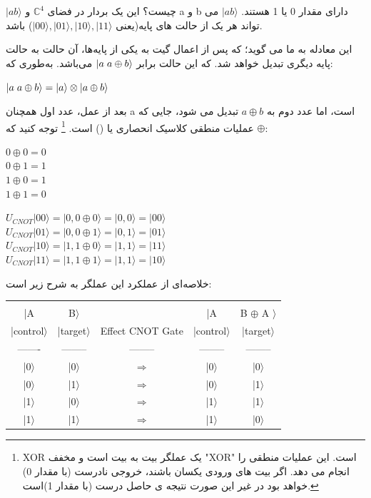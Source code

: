 \documentclass{book}
\begin{document}
 $\vert ab \rangle$ چیست؟
  این یک بردار در فضای $\mathbb{C}^4$ و a و b دارای مقدار 0 یا 1 هستند.  $\vert ab \rangle$ می تواند هر یک از حالت های پایه(یعنی  $\vert 00 \rangle, \vert 01 \rangle, \vert 10 \rangle, \vert 11 \rangle$) باشد.
 
  
  
   این معادله به ما می گوید؛ که پس از اعمال گیت  به یکی از پایه‌ها، آن حالت به حالت پایه دیگری تبدیل خواهد شد. که این حالت برابر $\vert a\hspace{0.1cm} a \oplus b\rangle$ می‌باشد. به‌طوری که:
   
   \begin{center}
   	$\vert a\hspace{0.1cm}a\oplus b\rangle = \vert a \rangle \otimes \vert a \oplus b \rangle$ 
   \end{center}

 بعد از عمل، عدد اول همچنان a است، اما عدد دوم به $a \oplus b$ تبدیل می شود، جایی که $\oplus$ عملیات منطقی کلاسیک انحصاری یا () است.
 \footnote{XOR یک عملگر بیت به بیت است و مخفف "XOR" است. این عملیات منطقی را انجام می دهد. اگر بیت های ورودی یکسان باشند، خروجی  نادرست (با مقدار 0) خواهد بود در غیر این صورت نتیجه ی حاصل درست (با مقدار 1)است.}
  توجه کنید که:
 \begin{center}
 	$0 \oplus 0 = 0$\\
 	$0 \oplus 1 = 1$\\
 	$1 \oplus 0 = 1$\\
 	$1 \oplus 1 = 0$\\
 \end{center}
 
\begin{center}
	$U_{CNOT}|00\rangle=|0,0 \oplus 0\rangle=|0,0\rangle=|00\rangle$ \\
	$U_{CNOT}|01\rangle=|0,0 \oplus 1\rangle=|0,1\rangle=|01\rangle$ \\
	$U_{CNOT}|10\rangle=|1,1 \oplus 0\rangle=|1,1\rangle=|11\rangle$\\
	$U_{CNOT}|11\rangle=|1,1 \oplus 1\rangle=|1,1\rangle=|10\rangle$
\end{center}

خلاصه‌ای از عملکرد این عملگر به شرح زیر است:\\

\begin{latin}
\begin{tabular}{ccccc}
	&&&&\\
	|A & B$\rangle$ &	&  |A &B $\oplus$ A $\rangle$  \\
	|control$\rangle$ & |target$\rangle$ & Effect CNOT Gate &|control$\rangle$ & |target$\rangle$ \\
	------- & -------- & -------- & -------- & --------  \\
	|0$\rangle$ & |0$\rangle$ & $\Longrightarrow$ &|0$\rangle$ & |0$\rangle$ \\
	|0$\rangle$ & |1$\rangle$ & $\Longrightarrow$ &|0$\rangle$ & |1$\rangle$ \\
	|1$\rangle$ & |0$\rangle$ & $\Longrightarrow$ &|1$\rangle$ & |1$\rangle$ \\
	|1$\rangle$ & |1$\rangle$ & $\Longrightarrow$ &|1$\rangle$ & |0$\rangle$
\end{tabular}
\end{latin}
\end{document}
